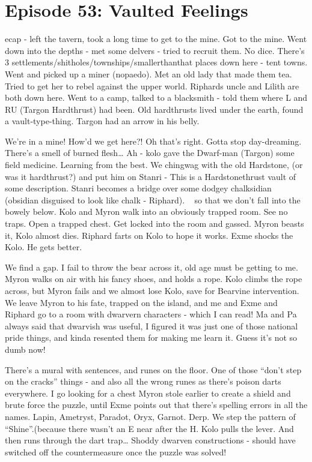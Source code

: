 \section{Episode 53: Vaulted Feelings}

\medskip

ecap - left the tavern, took a long time to get to the mine. Got to the mine. Went down into the depths - met some delvers - tried to recruit them. No dice. There’s 3 settlements/shitholes/townships/smallerthanthat places down here - tent towns. Went and picked up a miner (nopaedo). Met an old lady that made them tea. Tried to get her to rebel against the upper world. Riphards uncle and Lilith are both down here. Went to a camp, talked to a blacksmith - told them where L and RU (Targon Hardthrust) had been. Old hardthrusts lived under the earth, found a vault-type-thing. Targon had an arrow in his belly.\medskip

We’re in a mine! How’d we get here?! Oh that’s right. Gotta stop day-dreaming. There’s a smell of burned flesh… Ah - kolo gave the Dwarf-man (Targon) some field medicine. Learning from the best. We chingwag with the old Hardstone, (or was it hardthrust?) and put him on Stanri - This is a Hardstonethrust vault of some description. Stanri becomes a bridge over some dodgey chalksidian (obsidian disguised to look like chalk - Riphard). ~ so that we don’t fall into the bowely below. Kolo and Myron walk into an obviously trapped room. See no traps. Open a trapped chest. Get locked into the room and gassed. Myron beasts it, Kolo almost dies. Riphard farts on Kolo to hope it works. Exme shocks the Kolo. He gets better.\medskip

We find a gap. I fail to throw the bear across it, old age must be getting to me. Myron walks on air with his fancy shoes, and holds a rope. Kolo climbs the rope across, but Myron fails and we almost lose Kolo, save for Bearvine intervention. We leave Myron to his fate, trapped on the island, and me and Exme and Riphard go to a room with dwarvern characters - which I can read! Ma and Pa always said that dwarvish was useful, I figured it was just one of those national pride things, and kinda resented them for making me learn it. Guess it’s not so dumb now!\medskip

There’s a mural with sentences, and runes on the floor. One of those “don’t step on the cracks” things - and also all the wrong runes as there’s poison darts everywhere. I go looking for a chest Myron stole earlier to create a shield and brute force the puzzle, until Exme points out that there’s spelling errors in all the names. Lapin, Ametryst, Paradot, Oryx, Garnot. Derp. We step the pattern of “Shine”.(because there wasn’t an E near after the H. Kolo pulls the lever. And then runs through the dart trap… Shoddy dwarven constructions - should have switched off the countermeasure once the puzzle was solved!\medskip

